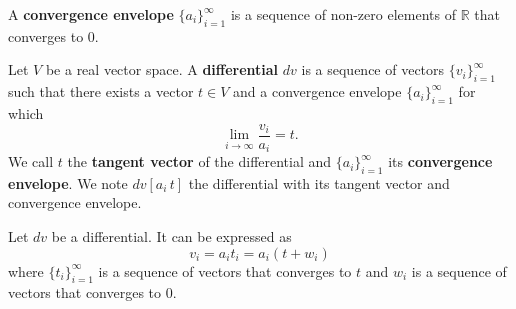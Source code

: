 \documentclass[11pt,letterpaper,fleqn]{memoir}
\begin{document}
\begin{defn}
	A \textbf{convergence envelope} $\{a_i\}_{i=1}^{\infty}$ is a sequence of non-zero elements of $\mathbb{R}$ that converges to $0$.
\end{defn}

\iffalse

\begin{defn}[Convergence at the same rate]
	Let $\{a_i\}_{i=1}^{\infty}$ and $\{b_i\}_{i=1}^{\infty}$ be two convergence envelopes. We say that they \textbf{converge at the same rate} if 
	$$ \lim\limits_{i \to \infty} \frac{a_i}{b_i} = 1.$$
\end{defn}

\begin{prop}
	Convergence at the same rate is an equivalence relation.
\end{prop}

\begin{proof}
	For reflexivity:
	$$ \lim\limits_{i \to \infty} \frac{a_i}{a_i} = \lim\limits_{i \to \infty} 1 = 1.$$
	For symmetry:
	$$ \lim\limits_{i \to \infty} \frac{b_i}{a_i} = \lim\limits_{i \to \infty} \frac{1}{\frac{a_i}{b_i}} = \frac{ \lim\limits_{i \to \infty} 1}{\lim\limits_{i \to \infty} \frac{a_i}{b_i}} = \frac{1}{1} = 1.$$
	For transitivity:
	$$ \lim\limits_{i \to \infty} \frac{a_i}{c_i} = \lim\limits_{i \to \infty} \frac{a_i}{b_i}\frac{b_i}{c_i} = \lim\limits_{i \to \infty} \frac{a_i}{b_i} \lim\limits_{i \to \infty} \frac{b_i}{c_i} = 1 \cdot 1 = 1.$$
\end{proof}

\begin{defn}[Convergence class]
	A \textbf{convergence class} is an equivalence class of sequences that converge at the same rate.
\end{defn}
\fi

\begin{defn}
	Let $V$ be a real vector space. A \textbf{differential} $dv$ is a sequence of vectors $\{v_i\}_{i=1}^{\infty}$ such that there exists a vector $t \in V$ and a convergence envelope $\{a_i\}_{i=1}^{\infty}$ for which 
	$$ \lim\limits_{i \to \infty} \frac{v_i}{a_i} = t.$$
	We call $t$ the \textbf{tangent vector} of the differential and $\{a_i\}_{i=1}^{\infty}$ its \textbf{convergence envelope}. We note $dv[a_i \, t]$ the differential with its tangent vector and convergence envelope.
\end{defn}

\begin{prop}
	Let $dv$ be a differential. It can be expressed as
	$$ v_i = a_i t_i = a_i(t + w_i)$$
	where $\{t_i\}_{i=1}^{\infty}$ is a sequence of vectors that converges to $t$ and $w_i$ is a sequence of vectors that converges to $0$.
\end{prop}
\end{document}
